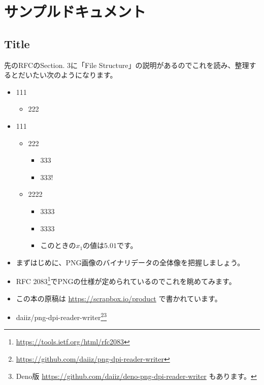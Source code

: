 \maketitle

\chapter{サンプルドキュメント} %
\label{textBlock-89d459014adec40260a60f54fd4771b7}
\section{Title}
先のRFCのSection. 3に「File Structure」の説明があるのでこれを読み、整理するとだいたい次のようになります。
\begin{itemize}
  \item 111
  \begin{itemize}
    \item 222
  \end{itemize}
  \item 111
  \begin{itemize}
    \item 222
    \begin{itemize}
      \item 333
      \item 333!
    \end{itemize}
    \item 2222
    \begin{itemize}
      \item 3333
      \item 3333
      \item このときの$x_1$の値は$5.01$です。
    \end{itemize}
  \end{itemize}
\end{itemize}
\begin{itemize}
  \item まずはじめに、PNG画像のバイナリデータの全体像を把握しましょう。
  \item RFC 2083\footnote{\url{https://tools.ietf.org/html/rfc2083}}でPNGの仕様が定められているのでこれを眺めてみます。
  \item この本の原稿は \url{https://scrapbox.io/product} で書かれています。
  \item daiiz/png-dpi-reader-writer\footnote{\url{https://github.com/daiiz/png-dpi-reader-writer}}\footnote{Deno版 \url{https://github.com/daiiz/deno-png-dpi-reader-writer} もあります。}
\end{itemize}

